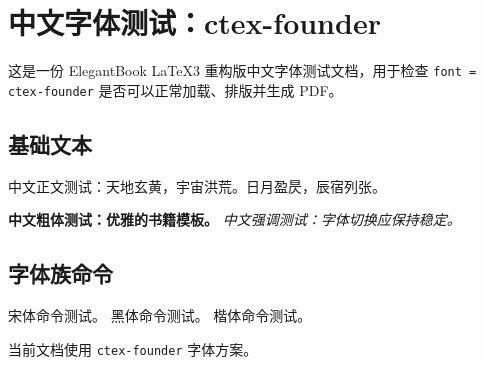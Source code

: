 \documentclass[lang = cn, font = ctex-founder, mode = simple]{elegantbook-l3}
\begin{document}
\frontmatter
\tableofcontents

\mainmatter
\chapter{中文字体测试：ctex-founder}

这是一份 ElegantBook LaTeX3 重构版中文字体测试文档，用于检查
\texttt{font = ctex-founder} 是否可以正常加载、排版并生成 PDF。

\section{基础文本}

中文正文测试：天地玄黄，宇宙洪荒。日月盈昃，辰宿列张。

\textbf{中文粗体测试：优雅的书籍模板。}
\emph{中文强调测试：字体切换应保持稳定。}

\section{字体族命令}

{\songti 宋体命令测试。}
{\heiti 黑体命令测试。}
{\kaishu 楷体命令测试。}

\begin{theorem}[字体方案]
  当前文档使用 \texttt{ctex-founder} 字体方案。
\end{theorem}
\end{document}
